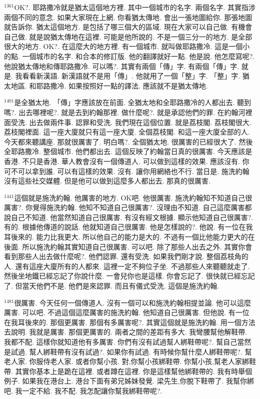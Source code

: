 \documentclass{book}
\begin{document}
$^{1361}$OK?.
耶路撒冷就是猶太這個地方裡.
其中一個城市的名字.
兩個名字.
其實指涉兩個不同的意念.
如果大家現在上網.
你看猶太傳地.
會出一張地圖給你.
那張地圖就告訴你.
猶太這個地方.
是包括了哪三個大的區域.
現在大家可以自己做.
有機會自己做.
就是說猶太傳地在這裡.
可能是他所說的.
不是一個三分一的地方.
是全部很大的地方.
OK?.
在這麼大的地方裡.
有一個城市.
就叫做耶路撒冷.
這是一個小的點.
一個城市的名字.
和合本的修訂版.
他的翻譯就好一點.
他是說.
他怎麼寫呢?.
他說猶太傳地和傳耶路撒冷.
可以嗎?.
其實有兩個「傳」字.
有兩個「傳」字.
就是.
我看看新漢語.
新漢語就不是用「傳」.
他就用了一個「整」字.
「整」字.
猶太地區.
和耶路撒冷.
如果按照好一點的譯法.
應該就不是猶太傳地.

$^{1401}$是全猶太地.
「傳」字應該放在前面.
全猶太地和全耶路撒冷的人都出去.
聽到嗎?.
出去哪裡呢?.
就是去到約翰那裡.
做什麼呢?.
就是承認他們的罪.
在約翰河裡面受洗.
出去做兩件事.
認罪和受洗.
我們現在這個位置.
就是荔枝閣.
荔枝閣很大.
荔枝閣裡面.
這一座大廈就只有這一座大廈.
全個荔枝閣.
和這一座大廈全部的人.
今天都來聽講座.
那就很厲害了.
明白嗎?.
全個猶太地.
很厲害的已經很大了.
然後全耶路撒冷.
整個城市.
他們都出去.
這個反映了約翰當日真的很厲害.
今天應該是香港.
不只是香港.
華人教會沒有一個傳道人.
可以做到這樣的效果.
應該沒有.
你可不可以拿到誰.
可以有這樣的效果.
沒有.
讓你用網絡也不行.
當日是.
施洗約翰沒有這些社交媒體.
但是他可以做到這麼多人都出去.
那真的很厲害.

$^{1441}$這個就是施洗約翰.
他厲害的地方.
OK吧.
他很厲害.
施洗約翰知不知道自己很厲害?.
你覺得施洗約翰.
他知不知道自己很厲害?.
沒理由不知道.
自己這麼厲害都說自己不知道.
他當然知道自己很厲害.
有沒有經文根據.
顯示他知道自己很厲害?.
有的.
根據他傳道的說話.
他就知道自己很厲害.
他是怎樣說的?.
他說.
有一位在我耳後來的.
能力比我更大.
所以他自己的能力是大的.
不過有一個比他能力更大的在後面.
所以施洗約翰其實知道自己很厲害.
可以吧.
除了那些人出去之外.
其實你會看到那些人出去做什麼呢?.
他們認罪.
還有受洗.
如果我們剛才說.
整個荔枝角的人.
還有這座大廈所有的人都來.
這裡一定不夠位子坐.
不過那些人來聽聽就走了.
然後坐地鐵已經忘記了你說什麼.
一會兒你也是這樣.
你會忘記了.
很快就已經忘記了.
但當天他們不是.
他們是來認罪.
而且有儀式受洗.
這個是施洗約翰.

$^{1481}$很厲害.
今天任何一個傳道人.
沒有一個可以和施洗約翰相提並論.
他可以這麼厲害.
可以吧.
不過這個這麼厲害的施洗約翰.
他知道自己很厲害.
但他說.
有一位在我耳後來的.
那個更厲害.
那個有多厲害呢?.
其實這個就是施洗約翰.
用一個方法去說明.
我就是厲害.
那個更厲害的.
兩者之間的差距有多大.
我彎腰幫他解鞋帶.
我都不配.
這樣你就知道他有多厲害.
你們有沒有試過幫人綁鞋帶呢?.
幫自己當然是試過.
幫人綁鞋帶有沒有試過?.
如果你有試過.
有時候你幫什麼人綁鞋帶呢?.
幫老人家.
你服侍老人家.
或者你幫小孩.
對,你幫小孩綁鞋帶.
你幫小孩,幫老人家綁鞋帶.
其實你基本上是跪在這裡.
或者蹲在這裡.
你是這樣幫他綁鞋帶的.
我有時舉個例子.
如果我在港台上.
港台下面有弟兄姊妹發覺.
梁先生,你脫下鞋帶了.
我幫你綁吧.
我一定不給.
我不配.
我怎配讓你幫我綁鞋帶呢?.
\end{document}
